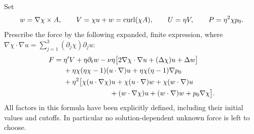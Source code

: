 Set
\begin{equation}\label{eq:vs-compact-fields}
 w=\nabla\chi\times A,\qquad V=\chi u+w=\operatorname{curl}(\chi A),
 \qquad U=\eta V,\qquad P=\eta^2\chi p_0.
\end{equation}
Prescribe the force by the following expanded, finite expression, where
$\nabla\chi\cdot\nabla u=\sum_{j=1}^3(\partial_j\chi)\partial_j u$:
\begin{align}
 F={}&\eta'V+\eta\partial_t w
 -\nu\eta\bigl[2\nabla\chi\cdot\nabla u+(\Delta\chi)u+\Delta w\bigr]
 \nonumber\\
 &+\eta\chi(\eta\chi-1)(u\cdot\nabla)u
 +\eta\chi(\eta-1)\nabla p_0\nonumber\\
 &+\eta^2\bigl[\chi(u\cdot\nabla\chi)u
       +\chi(u\cdot\nabla)w+\chi(w\cdot\nabla)u
 \nonumber\\
 &\hspace{23mm}+(w\cdot\nabla\chi)u+(w\cdot\nabla)w
       +p_0\nabla\chi\bigr].
 \label{eq:vs-compact-force}
\end{align}
All factors in this formula have been explicitly defined, including their
initial values and cutoffs. In particular no solution-dependent unknown
force is left to choose.


